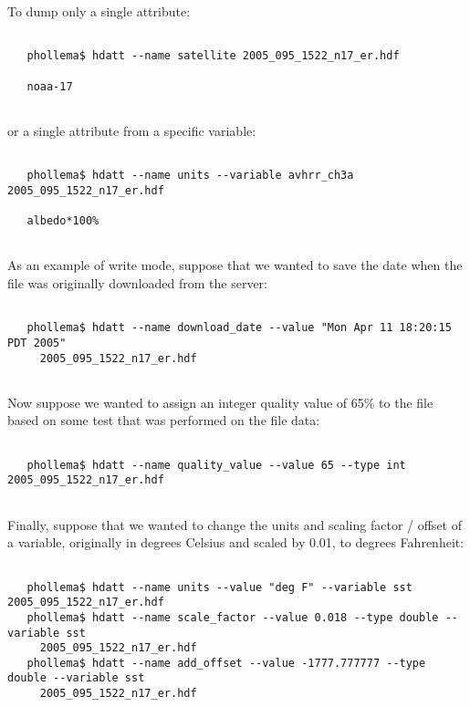  To dump only a single attribute:
\begin{verbatim}

   phollema$ hdatt --name satellite 2005_095_1522_n17_er.hdf

   noaa-17
 
\end{verbatim}


 or a single attribute from a specific variable:
\begin{verbatim}

   phollema$ hdatt --name units --variable avhrr_ch3a 2005_095_1522_n17_er.hdf

   albedo*100%
 
\end{verbatim}


 As an example of write mode, suppose that we wanted to save the date when the file was originally downloaded from the server:
\begin{verbatim}

   phollema$ hdatt --name download_date --value "Mon Apr 11 18:20:15 PDT 2005" 
     2005_095_1522_n17_er.hdf
 
\end{verbatim}


 Now suppose we wanted to assign an integer quality value of 65\% to the file based on some test that was performed on the file data:
\begin{verbatim}

   phollema$ hdatt --name quality_value --value 65 --type int 2005_095_1522_n17_er.hdf
 
\end{verbatim}


 Finally, suppose that we wanted to change the units and scaling factor / offset of a variable, originally in degrees Celsius and scaled by 0.01, to degrees Fahrenheit:
\begin{verbatim}

   phollema$ hdatt --name units --value "deg F" --variable sst 2005_095_1522_n17_er.hdf
   phollema$ hdatt --name scale_factor --value 0.018 --type double --variable sst 
     2005_095_1522_n17_er.hdf
   phollema$ hdatt --name add_offset --value -1777.777777 --type double --variable sst 
     2005_095_1522_n17_er.hdf
 
\end{verbatim}

\newpage
